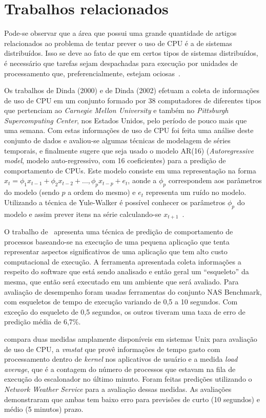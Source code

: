 %
%

\chapter{Trabalhos relacionados}

Pode-se observar que a área que possui uma grande quantidade de artigos
relacionados ao problema de tentar prever o uso de CPU é a de sistemas
distribuídos. Isso se deve ao fato de que em certos tipos de sistemas
distribuídos, é necessário que tarefas sejam despachadas para execução por
unidades de processamento que, preferencialmente, estejam ociosas~\cite{zhang2007cpu}.

Os trabalhos de Dinda (2000)\nocite{dinda2000host} e de Dinda
(2002)\nocite{dinda2002evaluation} efetuam a coleta de informações de uso de
CPU em um conjunto formado por 38 computadores de diferentes tipos que
pertenciam ao \emph{Carnegie Mellon University} e também no \emph{Pittsburgh
Supercomputing Center}, nos Estados Unidos, pelo período de pouco mais que uma
semana. Com estas informações de uso de CPU foi feita uma análise deste conjunto
de dados e avaliou-se algumas técnicas de modelagem de séries temporais, e
finalmente sugere que seja usado o modelo AR(16) (\emph{Autoregressive model},
modelo auto-regressivo, com 16 coeficientes) para a predição de comportamento
de CPUs. Este modelo consiste em uma representação na forma
$x_t = \phi_{1}x_{t-1} + \phi_{2}x_{t-2}+\dotsc,\phi_{p}x_{t-p}+e_t$, aonde a
$\phi_p$ correspondem aos parâmetros do modelo (sendo $p$ a ordem do mesmo) e
$e_t$ representa um ruído no modelo. Utilizando a técnica de Yule-Walker é
possível conhecer os parâmetros $\phi_p$ do modelo e assim prever itens na
série calculando-se $x_{t+1}$~\cite{baddour2005autoregressive}.

O trabalho de~ apresenta uma técnica de
predição de comportamento de processos baseando-se na execução de uma pequena
aplicação que tenta representar aspectos significativos de uma aplicação que
tem alto custo computacional de execução. A ferramenta apresentada coleta
informações a respeito do software que está sendo analisado e então geral um
“esqueleto” da mesma, que então será executado em um ambiente que será
avaliado. Para avaliação de desempenho foram usadas ferramentas do conjunto NAS
Benchmark, com esqueletos de tempo de execução variando de 0,5 a 10 segundos.
Com exceção do esqueleto de 0,5 segundos, os outros tiveram uma taxa de erro de
predição média de 6,7\%. 

 compara duas medidas amplamente disponíveis
em sistemas Unix para avaliação de uso de CPU, a \emph{vmstat} que provê
informações de tempo gasto com processamento dentro de \emph{kernel} nos
aplicativos de usuário e a medida \emph{load average}, que é a contagem do
número de processos que estavam na fila de execução do escalonador no último
minuto. Foram feitas predições utilizando o \emph{Network Weather Service}
\cite{wolski1999network} para a avaliação dessas medidas. As avaliações
demonstraram que ambas tem baixo erro para previsões de curto (10 segundos) e
médio (5 minutos) prazo.

